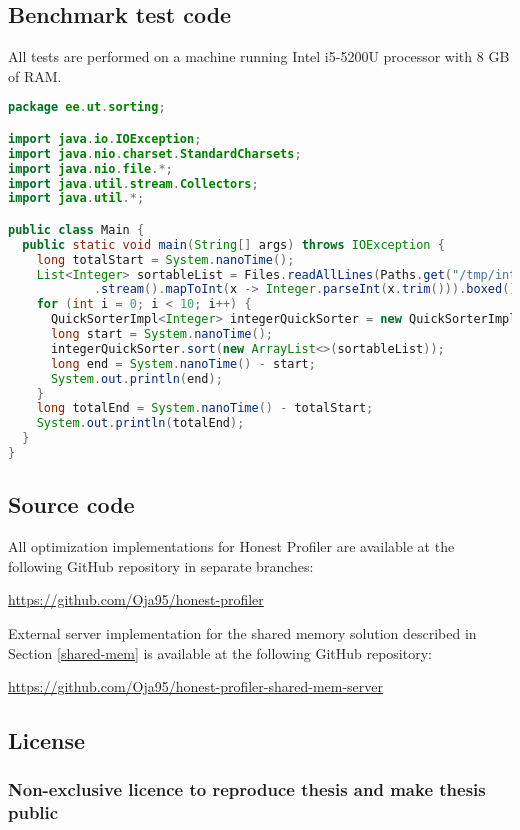 \documentclass[..thesis.tex]{subfiles}
\begin{document}
\subsection{Benchmark test code}
\label{A:benchmark-test-code}
All tests are performed on a machine running Intel i5-5200U processor with 8 GB of RAM.

\begin{lstlisting}[language=Java,style=def]
package ee.ut.sorting;

import java.io.IOException;
import java.nio.charset.StandardCharsets;
import java.nio.file.*;
import java.util.stream.Collectors;
import java.util.*;

public class Main {
  public static void main(String[] args) throws IOException {
    long totalStart = System.nanoTime();
    List<Integer> sortableList = Files.readAllLines(Paths.get("/tmp/integers.data"), StandardCharsets.UTF_8)
            .stream().mapToInt(x -> Integer.parseInt(x.trim())).boxed().collect(Collectors.toList());
    for (int i = 0; i < 10; i++) {
      QuickSorterImpl<Integer> integerQuickSorter = new QuickSorterImpl<>();
      long start = System.nanoTime();
      integerQuickSorter.sort(new ArrayList<>(sortableList));
      long end = System.nanoTime() - start;
      System.out.println(end);
    }
    long totalEnd = System.nanoTime() - totalStart;
    System.out.println(totalEnd);
  }
}

\end{lstlisting}

\subsection{Source code}
\label{B:source-code}
All optimization implementations for Honest Profiler are available at the following GitHub repository in separate branches:

\url{https://github.com/Oja95/honest-profiler}

External server implementation for the shared memory solution described in Section \ref{shared-mem} is available at the following GitHub repository:

\url{https://github.com/Oja95/honest-profiler-shared-mem-server}

\pagebreak
\subsection{License}
\subsubsection*{Non-exclusive licence to reproduce thesis and make thesis public}
\end{document}
